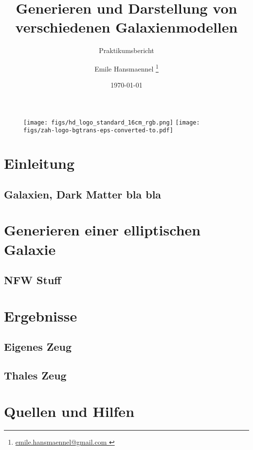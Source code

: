 \documentclass[a4paper,12pt]{scrartcl}
\title{{\fontsize{30}{20}\selectfont Generieren und Darstellung von verschiedenen Galaxienmodellen}}
\subtitle{Praktikumsbericht}
\author{ Emile Hansmaennel \footnote{\url{ emile.hansmaennel@gmail.com }}}
\date{\today}
\begin{document}
 
 \maketitle 
 
 \begin{figure}[h]
  \centering
  \texttt{[image: figs/hd\_logo\_standard\_16cm\_rgb.png]}\hfill
  \texttt{[image: figs/zah-logo-bgtrans-eps-converted-to.pdf]}
  \captionsetup{labelformat=empty}
  \caption{}
 \end{figure}
  
 \thispagestyle{empty}
 \clearpage
 \newpage
 \setcounter{page}{1}
 
 \tableofcontents
 \newpage
 
 \section{Einleitung} \label{Einleitung}
\subsection{Galaxien, Dark Matter bla bla}

 \newpage
 
 \section{Generieren einer elliptischen Galaxie} \label{Hauptteil}
\subsection{NFW Stuff}
\subsection{}

 \newpage
 
 \section{Ergebnisse} \label{ergebnisse}
\subsection{Eigenes Zeug}
\subsection{Thales Zeug}

 \newpage
 
 \section{Quellen und Hilfen} \label{quellen}

 
\end{document}
